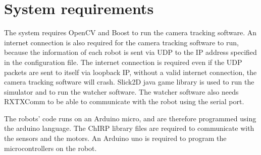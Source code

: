 \chapter{System requirements}

The system requires OpenCV and Boost to run the camera tracking software. An internet connection is also required for the camera tracking software to run, because the information of each robot is sent via UDP to the IP address specified in the configuration file. The internet connection is required even if the UDP packets are sent to itself via loopback IP, without a valid internet connection, the camera tracking software will crash.
Slick2D java game library is used to run the simulator and to run the watcher software. 
The watcher software also needs RXTXComm to be able to communicate with the robot using the serial port.

The robots' code runs on an Arduino micro, and are therefore programmed using the arduino language. The ChIRP library files are required to communicate with the sensors and the motors. An Arduino uno is required to program the microcontrollers on the robot.